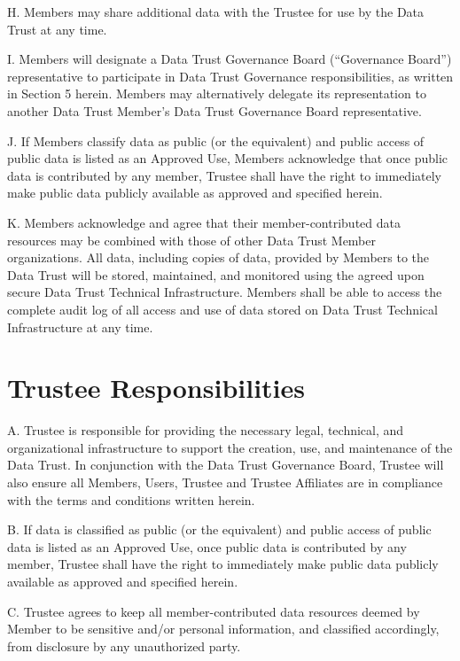 \documentclass[]{book}
\begin{document}
H. Members may share additional data with the Trustee for use by the Data Trust at any time.

I. Members will designate a Data Trust Governance Board (``Governance Board'') representative to participate in Data Trust Governance responsibilities, as written in Section 5 herein. Members may alternatively delegate its representation to another Data Trust Member's Data Trust Governance Board representative.

J. If Members classify data as public (or the equivalent) and public access of public data is listed as an Approved Use, Members acknowledge that once public data is contributed by any member, Trustee shall have the right to immediately make public data publicly available as approved and specified herein.

K. Members acknowledge and agree that their member-contributed data resources may be combined with those of other Data Trust Member organizations. All data, including copies of data, provided by Members to the Data Trust will be stored, maintained, and monitored using the agreed upon secure Data Trust Technical Infrastructure. Members shall be able to access the complete audit log of all access and use of data stored on Data Trust Technical Infrastructure at any time.

\hypertarget{trustee-responsibilities}{%
\chapter{Trustee Responsibilities}\label{trustee-responsibilities}}

A. Trustee is responsible for providing the necessary legal, technical, and organizational infrastructure to support the creation, use, and maintenance of the Data Trust. In conjunction with the Data Trust Governance Board, Trustee will also ensure all Members, Users, Trustee and Trustee Affiliates are in compliance with the terms and conditions written herein.

B. If data is classified as public (or the equivalent) and public access of public data is listed as an Approved Use, once public data is contributed by any member, Trustee shall have the right to immediately make public data publicly available as approved and specified herein.

C. Trustee agrees to keep all member-contributed data resources deemed by Member to be sensitive and/or personal information, and classified accordingly, from disclosure by any unauthorized party.
\end{document}
